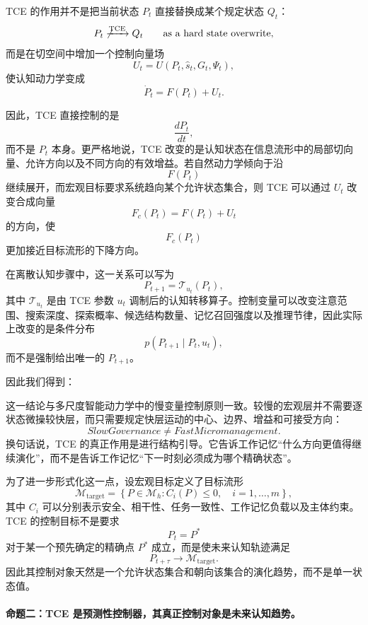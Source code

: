 TCE 的作用并不是把当前状态 $P_t$ 直接替换成某个规定状态 $Q_t$：
\[
P_t
\not\xrightarrow{\mathrm{TCE}}
Q_t
\qquad
\text{as a hard state overwrite},
\]
而是在切空间中增加一个控制向量场
\[
U_t
=
U(P_t,\hat{s}_t,G_t,\Psi_t),
\]
使认知动力学变成
\[
\dot P_t
=
F(P_t)+U_t.
\label{eq:information-geometric-controlled-flow}
\]

因此，TCE 直接控制的是
\[
\frac{dP_t}{dt},
\]
而不是 $P_t$ 本身。更严格地说，TCE 改变的是认知状态在信息流形中的局部切向量、允许方向以及不同方向的有效增益。若自然动力学倾向于沿
\[
F(P_t)
\]
继续展开，而宏观目标要求系统趋向某个允许状态集合，则 TCE 可以通过 $U_t$ 改变合成向量
\[
F_c(P_t)
=
F(P_t)+U_t
\]
的方向，使
\[
F_c(P_t)
\]
更加接近目标流形的下降方向。

在离散认知步骤中，这一关系可以写为
\[
P_{t+1}
=
\mathcal{T}_{u_t}(P_t),
\]
其中 $\mathcal{T}_{u_t}$ 是由 TCE 参数 $u_t$ 调制后的认知转移算子。控制变量可以改变注意范围、搜索深度、探索概率、候选结构数量、记忆召回强度以及推理节律，因此实际上改变的是条件分布
\[
p(P_{t+1}\mid P_t,u_t),
\]
而不是强制给出唯一的 $P_{t+1}$。

因此我们得到：
\begin{statementbox}
\centering
{}
\end{statementbox}

这一结论与多尺度智能动力学中的慢变量控制原则一致。较慢的宏观层并不需要逐状态微操较快层，而只需要规定快层运动的中心、边界、增益和可接受方向：
\[
SlowGovernance
\neq
FastMicromanagement.
\]
换句话说，TCE 的真正作用是进行结构引导。它告诉工作记忆``什么方向更值得继续演化''，而不是告诉工作记忆``下一时刻必须成为哪个精确状态''。

为了进一步形式化这一点，设宏观目标定义了目标流形
\[
\mathcal{M}_{\mathrm{target}}
=
\left\{
P\in\mathcal{M}_{h}
:
C_i(P)\le 0,
\quad
i=1,\ldots,m
\right\},
\]
其中 $C_i$ 可以分别表示安全、相干性、任务一致性、工作记忆负载以及主体约束。TCE 的控制目标不是要求
\[
P_t=P^{*}
\]
对于某一个预先确定的精确点 $P^{*}$ 成立，而是使未来认知轨迹满足
\[
P_{t+\tau}
\rightarrow
\mathcal{M}_{\mathrm{target}}.
\]
因此其控制对象天然是一个允许状态集合和朝向该集合的演化趋势，而不是单一状态值。

\paragraph{命题二：TCE 是预测性控制器，其真正控制对象是未来认知趋势。}

